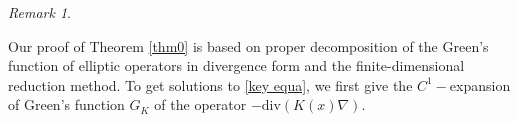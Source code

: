 \documentclass[12pt,reqno]{amsart}
\numberwithin{equation}{section}
\theoremstyle{definition}
\theoremstyle{remark}
\newtheorem{remark}[theorem]{Remark}
\begin{document}
\begin{remark}
\end{remark}


Our proof of Theorem \ref{thm0} is based on proper decomposition of the Green's function of elliptic operators in divergence form and the finite-dimensional reduction method. %
To get solutions to \eqref{key equa}, we  first  give the $ C^1- $expansion  of Green's function $ G_K $ of the operator $ -\text{div}(K(x)\nabla) $. %
\end{document}
